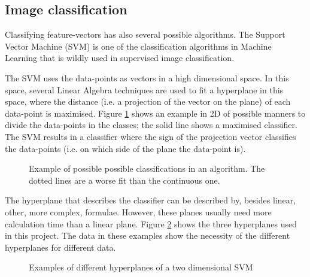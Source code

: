 \subsection{Image classification}
\label{sec:Theory-class}
Classifying feature-vectors has also several possible algorithms.
The Support Vector Machine (SVM) is one of the classification algorithms in Machine Learning that is wildly used in supervised image classification.

The SVM uses the data-points as vectors in a high dimensional space.
In this space, several Linear Algebra techniques are used to fit a hyperplane in this space, where the distance (i.e. a projection of the vector on the plane) of each data-point is maximised.
Figure \ref{fig:svm-fits} shows an example in 2D of possible manners to divide the data-points in the classes; the solid line shows a maximised classifier.
The SVM results in a classifier where the sign of the projection vector classifies the data-points (i.e. on which side of the plane the data-point is).

\begin{figure}[h!tb]
\centering
\ifx\showfig\undefined
 \fi
\caption{Example of possible possible classifications in an algorithm. The dotted lines are a worse fit than the continuous one.}
\label{fig:svm-fits}
\end{figure}

The hyperplane that describes the classifier can be described by, besides linear, other, more complex, formulae.
However, these planes usually need more calculation time than a linear plane.
Figure \ref{fig:svm-planes} shows the three hyperplanes used in this project.
The data in these examples show the necessity of the different hyperplanes for different data.

\begin{figure}[h!tb]
\centering
\ifx\showfig\undefined
 \fi
\caption{Examples of different hyperplanes of a two dimensional SVM }
\label{fig:svm-planes}
\end{figure}
